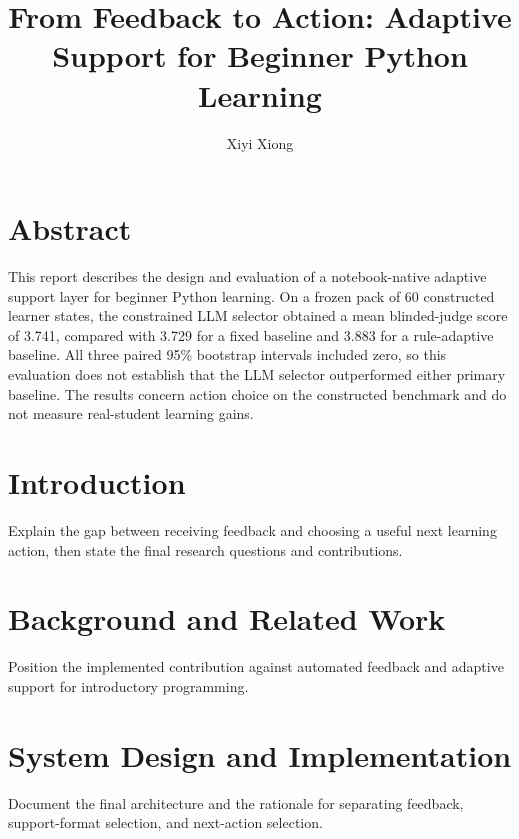 \documentclass[final-report]{../project-plan/report-template}
\title{From Feedback to Action: Adaptive Support for Beginner Python Learning}
\author{Xiyi Xiong}
\begin{document}
\maketitlepage

\section*{Abstract}

This report describes the design and evaluation of a notebook-native adaptive
support layer for beginner Python learning. On a frozen pack of 60 constructed
learner states, the constrained LLM selector obtained a mean blinded-judge score
of 3.741, compared with 3.729 for a fixed baseline and 3.883 for a rule-adaptive
baseline. All three paired 95\% bootstrap intervals included zero, so this
evaluation does not establish that the LLM selector outperformed either primary
baseline. The results concern action choice on the constructed benchmark and do
not measure real-student learning gains.

\section{Introduction}

Explain the gap between receiving feedback and choosing a useful next learning
action, then state the final research questions and contributions.

\section{Background and Related Work}

Position the implemented contribution against automated feedback and adaptive
support for introductory programming.

\section{System Design and Implementation}

Document the final architecture and the rationale for separating feedback,
support-format selection, and next-action selection.
\end{document}

